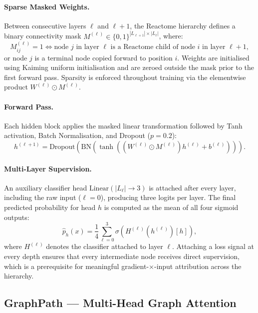 \paragraph{Sparse Masked Weights.}
Between consecutive layers $\ell$ and $\ell+1$, the Reactome hierarchy defines a binary connectivity mask $M^{(\ell)} \in \{0,1\}^{|L_{\ell+1}| \times |L_\ell|}$, where:
\begin{equation}
M^{(\ell)}_{ij} = 1 \iff \text{node } j \text{ in layer } \ell \text{ is a Reactome child of node } i \text{ in layer } \ell+1,
\end{equation}
or node $j$ is a terminal node copied forward to position $i$. Weights are initialised using Kaiming uniform initialisation and are zeroed outside the mask prior to the first forward pass. Sparsity is enforced throughout training via the elementwise product $W^{(\ell)} \odot M^{(\ell)}$.

\paragraph{Forward Pass.}
Each hidden block applies the masked linear transformation followed by Tanh activation, Batch Normalisation, and Dropout ($p = 0.2$):
\begin{equation}
h^{(\ell+1)} = \text{Dropout}\!\left(\text{BN}\!\left(\tanh\!\left(\left(W^{(\ell)} \odot M^{(\ell)}\right) h^{(\ell)} + b^{(\ell)}\right)\right)\right).
\end{equation}

\paragraph{Multi-Layer Supervision.}
An auxiliary classifier head $\text{Linear}(|L_\ell| \to 3)$ is attached after every layer, including the raw input ($\ell = 0$), producing three logits per layer. The final predicted probability for head $h$ is computed as the mean of all four sigmoid outputs:
\begin{equation}
\hat{p}_h(x) = \frac{1}{4} \sum_{\ell=0}^{3} \sigma\!\left(H^{(\ell)}(h^{(\ell)})[h]\right),
\end{equation}
where $H^{(\ell)}$ denotes the classifier attached to layer $\ell$. Attaching a loss signal at every depth ensures that every intermediate node receives direct supervision, which is a prerequisite for meaningful gradient-$\times$-input attribution across the hierarchy.

\subsection{GraphPath --- Multi-Head Graph Attention}

